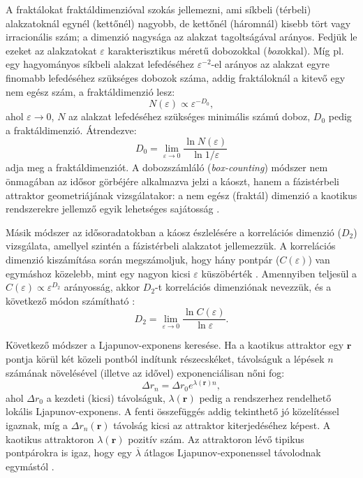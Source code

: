 \documentclass[12pt,a4paper]{article}
\begin{document}
A fraktálokat fraktáldimenzióval szokás jellemezni, ami síkbeli (térbeli) alakzatoknál egynél (kettőnél) nagyobb, de kettőnél (háromnál) kisebb tört vagy irracionális szám; a dimenzió nagysága az alakzat tagoltságával arányos. Fedjük le ezeket az alakzatokat $\varepsilon$ karakterisztikus méretű dobozokkal (\textit{box}okkal). Míg pl. egy hagyományos síkbeli alakzat lefedéséhez $\varepsilon^{-2}$-el arányos az alakzat egyre finomabb lefedéséhez szükséges dobozok száma, addig fraktáloknál a kitevő egy nem egész szám, a fraktáldimenzió lesz:
\[
N(\varepsilon)\propto \varepsilon^{-D_0},
\]
ahol $\varepsilon \rightarrow 0$, $N$ az alakzat lefedéséhez szükséges minimális számú doboz, $D_0$ pedig a fraktáldimenzió. Átrendezve:
\[
D_0=\lim_{\varepsilon \rightarrow 0}\frac{\ln N(\varepsilon)}{\ln 1/\varepsilon}
\]
adja meg a fraktáldimenziót. A dobozszámláló (\textit{box-counting}) módszer nem önmagában az idősor görbéjére alkalmazva jelzi a káoszt, hanem a fázistérbeli attraktor geometriájának vizsgálatakor: a nem egész (fraktál) dimenzió a kaotikus rendszerekre jellemző egyik lehetséges sajátosság \cite{tel_kaotikus_2002,panis_detection_2020}.

Másik módszer az idősoradatokban a káosz észlelésére a korrelációs dimenzió ($D_2$) vizsgálata, amellyel szintén a fázistérbeli alakzatot jellemezzük. A korrelációs dimenzió kiszámítása során megszámoljuk, hogy hány pontpár ($C(\varepsilon)$) van egymáshoz közelebb, mint egy nagyon kicsi $\varepsilon$ küszöbérték \cite{panis_detection_2020}. Amennyiben teljesül a $C(\varepsilon) \propto \varepsilon^{D_2}$ arányosság, akkor $D_2$-t korrelációs dimenziónak nevezzük, és a következő módon számítható \cite{panis_detection_2020, tel_kaotikus_2002}:
\[
D_2=\lim_{\varepsilon \rightarrow 0}\frac{\ln C(\varepsilon)}{\ln \varepsilon}.
\]

Következő módszer a Ljapunov-exponens keresése. Ha a kaotikus attraktor egy $\mathbf{r}$ pontja körül két közeli pontból indítunk részecskéket, távolságuk a lépések $n$ számának növelésével (illetve az idővel) exponenciálisan nőni fog:
\[
\Delta r_n=\Delta r_0 e^{\lambda(\mathbf{r})n},
\]
ahol $\Delta r_0$ a kezdeti (kicsi) távolságuk, $\lambda(\mathbf{r})$ pedig a rendszerhez rendelhető lokális Ljapunov-exponens. A fenti összefüggés addig tekinthető jó közelítéssel igaznak, míg a $\Delta r_n(\mathbf{r})$ távolság kicsi az attraktor kiterjedéséhez képest. A kaotikus attraktoron $\lambda(\mathbf{r})$ pozitív szám. Az attraktoron lévő tipikus pontpárokra is igaz, hogy egy $\overline\lambda$ átlagos Ljapunov-exponenssel távolodnak egymástól \cite{panis_detection_2020,tel_kaotikus_2002}.
\end{document}
